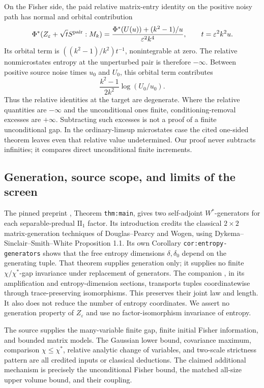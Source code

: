 \documentclass[11pt]{article}
\theoremstyle{definition}\newtheorem{definition}[theorem]{Definition}
\theoremstyle{remark}\newtheorem{remark}[theorem]{Remark}
\newcommand{\eps}{\varepsilon}\newcommand{\id}{\mathrm{id}}
\begin{document}
On the Fisher side, the paid relative matrix-entry identity on the
positive noisy path has normal and orbital contribution
\[
 \Phi^*(Z_\eps+\sqrt t S^{\rm pair}:M_k)
 =\frac{\Phi^*(U(u))+(k^2-1)/u}{\eps^2k^4},
 \qquad t=\eps^2k^2u.
\]
Its orbital term is $((k^2-1)/k^2)t^{-1}$, nonintegrable at zero.
The relative nonmicrostates entropy at the unperturbed pair is
therefore $-\infty$. Between positive source noise times $u_0$ and
$U_0$, this orbital term contributes
\[
 \frac{k^2-1}{2k^2}\log(U_0/u_0).
\]
Thus the relative identities at the target are degenerate. Where the
relative quantities are $-\infty$ and the unconditional ones finite,
conditioning-removal excesses are $+\infty$. Subtracting such excesses
is not a proof of a finite unconditional gap. In the ordinary-limsup
microstates case the cited one-sided theorem leaves even that relative
value undetermined. Our proof never subtracts infinities; it compares
direct unconditional finite increments.

\subsection{Generation, source scope, and limits of the screen}
The pinned preprint \cite{generation}, Theorem \texttt{thm:main},
gives two self-adjoint $W^*$-generators for each separable-predual
$\mathrm{II}_1$ factor. Its introduction credits the classical
$2\times2$ matrix-generation techniques of Douglas--Pearcy and Wogen,
using Dykema--Sinclair--Smith--White Proposition 1.1. Its own
Corollary \texttt{cor:entropy-generators} shows that the free entropy
dimensions $\delta,\delta_0$ depend on the generating tuple.
That theorem supplies generation only; it supplies no finite
$\chi/\chi^*$-gap invariance under replacement of generators.
The companion \cite{source287}, in its amplification and
entropy-dimension sections, transports tuples coordinatewise through
trace-preserving isomorphisms. This preserves their joint law and
length. It also does not reduce the number of entropy coordinates.
We assert no generation property of $Z_\eps$ and use no
factor-isomorphism invariance of entropy.

The source \cite{source298} supplies the many-variable finite gap,
finite initial Fisher information, and bounded matrix models. The
Gaussian lower bound, covariance maximum, comparison $\chi\leq\chi^*$,
relative analytic change of variables, and two-scale strictness
pattern are all credited inputs or classical deductions. The claimed
additional mechanism is precisely the unconditional Fisher bound,
the matched all-size upper volume bound, and their coupling.
\end{document}
